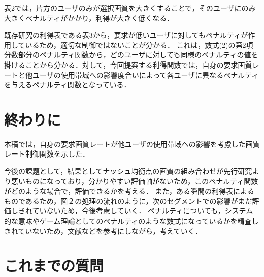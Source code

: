 \documentclass[rinkou,a4paper,uplatex]{ieicej}
\begin{document}
表2では，片方のユーザのみが選択画質を大きくすることで，そのユーザにのみ大きくペナルティがかかり，利得が大きく低くなる．

既存研究の利得表である表3から，要求が低いユーザに対してもペナルティが作用しているため，適切な制御ではないことが分かる．
これは，数式(2)の第2項分数部分のペナルティ関数から，どのユーザに対しても同様のペナルティの値を掛けることから分かる．対して，今回提案する利得関数では，自身の要求画質レートと他ユーザの使用帯域への影響度合いによって各ユーザに異なるペナルティを与えるペナルティ関数となっている．


\section{終わりに}
本稿では，自身の要求画質レートが他ユーザの使用帯域への影響を考慮した画質レート制御関数を示した．

今後の課題として，結果としてナッシュ均衡点の画質の組み合わせが先行研究より悪いものになっており，分かりやすい評価軸がないため，このペナルティ関数がどのような場合で，評価できるかを考える．
また，ある瞬間の利得表によるものであるため，図２の処理の流れのように，次のセグメントでの影響がまだ評価しきれていないため，今後考慮していく．
ペナルティについても，システム的な意味やゲーム理論としてのペナルティのような数式になっているかを精査しきれていないため，文献\cite{sigmund2010}などを参考にしながら，考えていく．


\section{これまでの質問}
\end{document}
